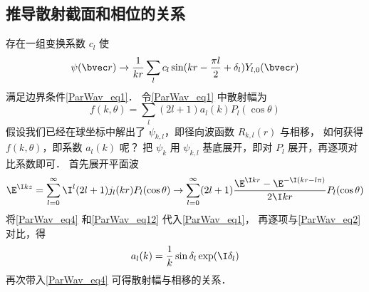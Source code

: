 \subsection{推导散射截面和相位的关系}
存在一组变换系数 $c_l$ 使
\begin{equation}\label{ParWav_eq2}
\psi(\bvec r) \rightarrow \frac{1}{kr} \sum_l c_l \sin(kr - \frac{\pi l}{2} + \delta_l) Y_{l,0}(\bvec r)
\end{equation}
满足边界条件\autoref{ParWav_eq1}． 令\autoref{ParWav_eq1} 中散射幅为
\begin{equation}\label{ParWav_eq4}
f(k,\theta) = \sum_l (2l + 1) a_l(k) P_l(\cos \theta)
\end{equation}
假设我们已经在球坐标中解出了 $\psi_{k,l}$，即径向波函数 $R_{k,l}(r)$ 与相移， 如何获得 $f(k,\theta )$，即系数 $a_l(k)$ 呢？ 把 $\psi_k$ 用 $\psi_{k,l}$ 基底展开，即对 $P_l$ 展开，再逐项对比系数即可． 首先展开平面波
\begin{equation}\label{ParWav_eq12}
\E^{\I kz} = \sum_{l = 0}^\infty  \I^l (2l + 1) j_l(kr) P_l(\cos \theta) \rightarrow \sum_{l=0}^\infty  (2l + 1)\frac{\E^{\I kr} - \E^{-\I(kr - l\pi)}}{2\I kr} P_l(\cos \theta)
\end{equation}
将\autoref{ParWav_eq4} 和\autoref{ParWav_eq12} 代入\autoref{ParWav_eq1}， 再逐项与\autoref{ParWav_eq2} 对比，得
\begin{equation}
a_l(k) = \frac{1}{k} \sin\delta_l \exp(\I \delta_l)
\end{equation}
再次带入\autoref{ParWav_eq4} 可得散射幅与相移的关系．
